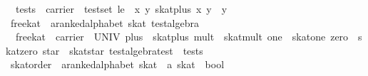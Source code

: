 \begin{isabellebody}
\ \ {}tests\ {}\ {}carrier\ {}\ test{}set{}\ le\ {}\ {}{}x\ y{}\ skat{}plus\ x\ y\ {}\ y{}{}{}\isanewline
\isanewline
{}\isamarkupfalse%
\ free{}kat\ {}{}\ {}{}a{}{}ranked{}alphabet\ skat\ test{}algebra{}\ \isanewline
\ \ {}free{}kat\ {}\ {}carrier\ {}\ UNIV{}\ plus\ {}\ skat{}plus{}\ mult\ {}\ skat{}mult{}\ one\ {}\ skat{}one{}\ zero\ {}\ skat{}zero{}\ star\ {}\ skat{}star{}\ test{}algebra{}test\ {}\ tests{}{}\isanewline
\isanewline
{}\isamarkupfalse%
\ skat{}order\ {}{}\ {}{}a{}{}ranked{}alphabet\ skat\ {}\ {}a\ skat\ {}\ bool{}\ {}\ {}{}{}\ {}{}{}\ \isanewline

\end{isabellebody}
